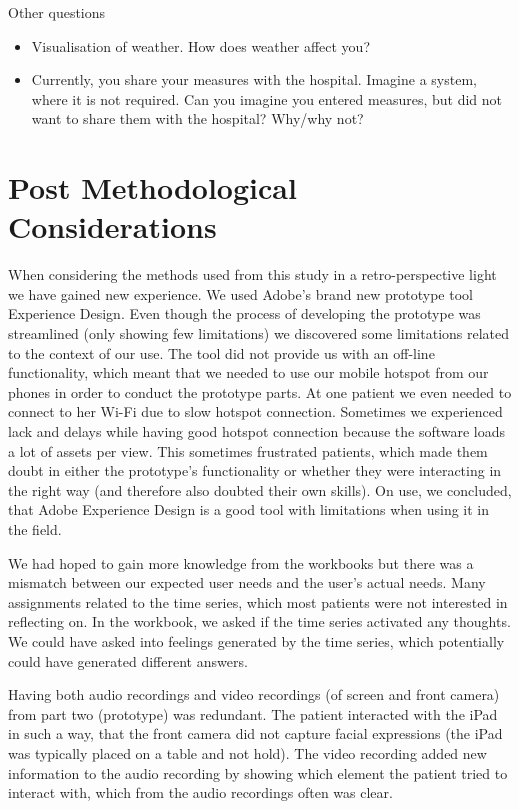 Other questions
\begin{itemize}
\item Visualisation of weather. How does weather affect you?
\item Currently, you share your measures with the hospital. Imagine a system, where it is not required. Can you imagine you entered measures, but did not want to share them with the hospital? Why/why not?
\end{itemize}



\section{Post Methodological Considerations}

When considering the methods used from this study in a retro-perspective light we have gained new experience.  We used Adobe's brand new prototype tool Experience Design. Even though the process of developing the prototype was streamlined (only showing few limitations) we discovered some limitations related to the context of our use. The tool did not provide us with an off-line functionality, which meant that we needed to use our mobile hotspot from our phones in order to conduct the prototype parts. At one patient we even needed to connect to her Wi-Fi due to slow hotspot connection. Sometimes we  experienced lack and delays while having good hotspot connection because the software loads a lot of assets per view. This sometimes frustrated patients, which made them doubt in either the prototype's functionality or whether they were interacting in the right way (and therefore also doubted their own skills). On use, we concluded, that Adobe Experience Design is a good tool with limitations when using it in the field. 

We had hoped to gain more knowledge from the workbooks but there was a mismatch between our expected user needs and the user's actual needs. Many assignments related to the time series, which most patients were not interested in reflecting on. In the workbook, we asked if the time series activated any thoughts. We could have asked into feelings generated by the time series, which potentially could have generated different answers.

Having both audio recordings and video recordings (of screen and front camera) from part two (prototype) was redundant. The patient interacted with the iPad in such a way, that the front camera did not capture facial expressions (the iPad was typically placed on a table and not hold). The video recording added new information to the audio recording by showing which element the patient tried to interact with, which from the audio recordings often was clear.